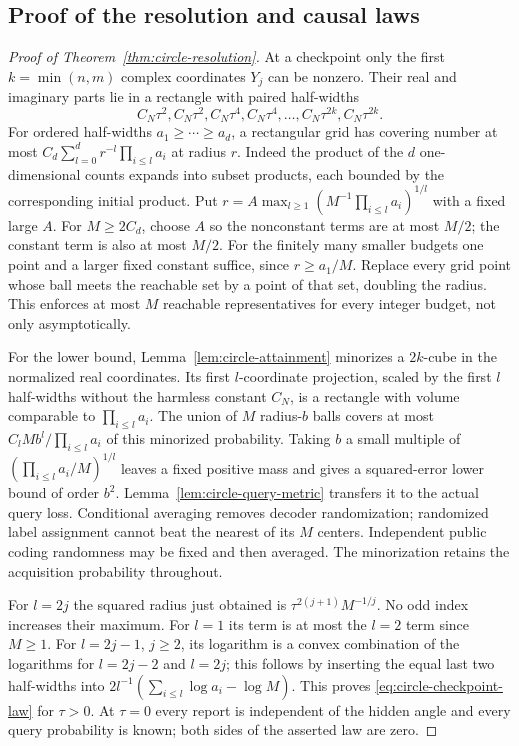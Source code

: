 \subsection{Proof of the resolution and causal laws}
\begin{proof}[Proof of Theorem~\ref{thm:circle-resolution}]
At a checkpoint only the first $k=\min(n,m)$ complex coordinates $Y_j$
can be nonzero. Their real and imaginary parts lie in a rectangle with
paired half-widths
\[
 C_N\tau^2,C_N\tau^2,C_N\tau^4,C_N\tau^4,
             \ldots,C_N\tau^{2k},C_N\tau^{2k}.
\]
For ordered half-widths $a_1\ge\cdots\ge a_d$, a rectangular grid
has covering number at most
$C_d\sum_{l=0}^d r^{-l}\prod_{i\le l}a_i$ at radius $r$.
Indeed the product of the $d$ one-dimensional counts expands into
subset products, each bounded by the corresponding initial product.
Put $r=A\max_{l\ge1}(M^{-1}\prod_{i\le l}a_i)^{1/l}$ with a
fixed large $A$. For $M\ge2C_d$, choose $A$ so the nonconstant
terms are at most $M/2$; the constant term is also at most $M/2$.
For the finitely many smaller budgets one point and a larger fixed
constant suffice, since $r\ge a_1/M$. Replace every grid point whose
ball meets the reachable set by a point of that set, doubling the radius.
This enforces at most $M$ reachable representatives for every integer
budget, not only asymptotically.

For the lower bound, Lemma~\ref{lem:circle-attainment} minorizes a
$2k$-cube in the normalized real coordinates. Its first $l$-coordinate
projection, scaled by the first $l$ half-widths without the harmless
constant $C_N$, is a rectangle with volume comparable to
$\prod_{i\le l}a_i$. The union of $M$ radius-$b$ balls covers at
most $C_lMb^l/\prod_{i\le l}a_i$ of this minorized probability.
Taking $b$ a small multiple of $(\prod_{i\le l}a_i/M)^{1/l}$
leaves a fixed positive mass and gives a squared-error lower bound of
order $b^2$. Lemma~\ref{lem:circle-query-metric} transfers it to the
actual query loss. Conditional averaging removes decoder randomization;
randomized label assignment cannot beat the nearest of its $M$ centers.
Independent public coding randomness may be fixed and then averaged.
The minorization retains the acquisition probability throughout.

For $l=2j$ the squared radius just obtained is
$\tau^{2(j+1)}M^{-1/j}$. No odd index increases their maximum.
For $l=1$ its term is at most the $l=2$ term since $M\ge1$.
For $l=2j-1$, $j\ge2$, its logarithm is a convex combination of
the logarithms for $l=2j-2$ and $l=2j$; this follows by inserting
the equal last two half-widths into
$2l^{-1}(\sum_{i\le l}\log a_i-\log M)$.
This proves \eqref{eq:circle-checkpoint-law} for $\tau>0$.
At $\tau=0$ every report is independent of the hidden angle and every
query probability is known; both sides of the asserted law are zero.


\end{proof}
